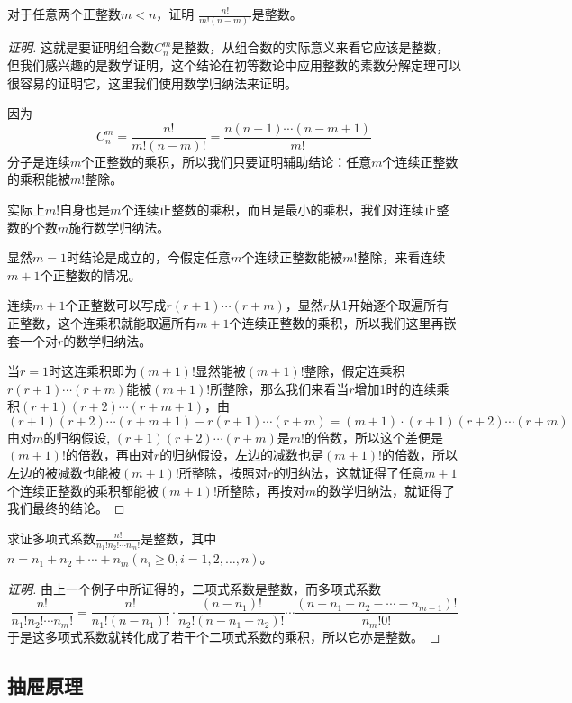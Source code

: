 \begin{example}
  对于任意两个正整数$m<n$，证明 $\frac{n!}{m!(n-m)!}$是整数。

\begin{proof}[证明]
  这就是要证明组合数$C_n^m$是整数，从组合数的实际意义来看它应该是整数，但我们感兴趣的是数学证明，这个结论在初等数论中应用整数的素数分解定理可以很容易的证明它，这里我们使用数学归纳法来证明。

  因为
  \[ C_n^m = \frac{n!}{m!(n-m)!} = \frac{n(n-1)\cdots(n-m+1)}{m!} \]
  分子是连续$m$个正整数的乘积，所以我们只要证明辅助结论：任意$m$个连续正整数的乘积能被$m!$整除。

  实际上$m!$自身也是$m$个连续正整数的乘积，而且是最小的乘积，我们对连续正整数的个数$m$施行数学归纳法。

  显然$m=1$时结论是成立的，今假定任意$m$个连续正整数能被$m!$整除，来看连续$m+1$个正整数的情况。

  连续$m+1$个正整数可以写成$r(r+1)\cdots (r+m)$，显然$r$从1开始逐个取遍所有正整数，这个连乘积就能取遍所有$m+1$个连续正整数的乘积，所以我们这里再嵌套一个对$r$的数学归纳法。

  当$r=1$时这连乘积即为$(m+1)!$显然能被$(m+1)!$整除，假定连乘积$r(r+1)\cdots (r+m)$能被$(m+1)!$所整除，那么我们来看当$r$增加1时的连续乘积$(r+1)(r+2)\cdots (r+m+1)$，由
  \[ (r+1)(r+2) \cdots (r+m+1) - r(r+1) \cdots (r+m) = (m+1) \cdot (r+1)(r+2) \cdots (r+m) \]
  由对$m$的归纳假设, $(r+1)(r+2) \cdots (r+m)$是$m!$的倍数，所以这个差便是$(m+1)!$的倍数，再由对$r$的归纳假设，左边的减数也是$(m+1)!$的倍数，所以左边的被减数也能被$(m+1)!$所整除，按照对$r$的归纳法，这就证得了任意$m+1$个连续正整数的乘积都能被$(m+1)!$所整除，再按对$m$的数学归纳法，就证得了我们最终的结论。
\end{proof}
\end{example}

\begin{example}
  求证多项式系数$\frac{n!}{n_1!n_2!\cdots n_m!}$是整数，其中$n=n_1+n_2+\cdots+n_m(n_i\geqslant 0, i=1,2,\ldots,n)$。

\begin{proof}[证明]
  由上一个例子中所证得的，二项式系数是整数，而多项式系数
  \[ \frac{n!}{n_1!n_2!\cdots n_m!} = \frac{n!}{n_1!(n-n_1)!} \cdot \frac{(n-n_1)!}{n_2!(n-n_1-n_2)!} \cdots \frac{(n-n_1-n_2-\cdots-n_{m-1})!}{n_m!0!} \]
  于是这多项式系数就转化成了若干个二项式系数的乘积，所以它亦是整数。
\end{proof}
\end{example}

\subsection{抽屉原理}
\label{sec:drawer-principle}




